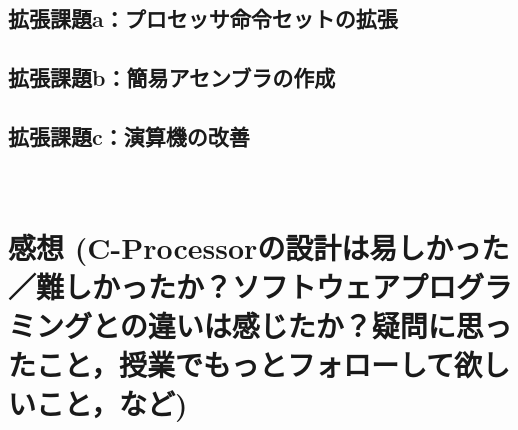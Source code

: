 \documentclass[a4paper,10pt]{jarticle}
\begin{document}
\subsection{拡張課題a：プロセッサ命令セットの拡張}
\subsection{拡張課題b：簡易アセンブラの作成}
\subsection{拡張課題c：演算機の改善}
~\\
\section{感想 (C-Processorの設計は易しかった／難しかったか？ソフトウェアプログラミングとの違いは感じたか？疑問に思ったこと，授業でもっとフォローして欲しいこと，など)}
\end{document}
